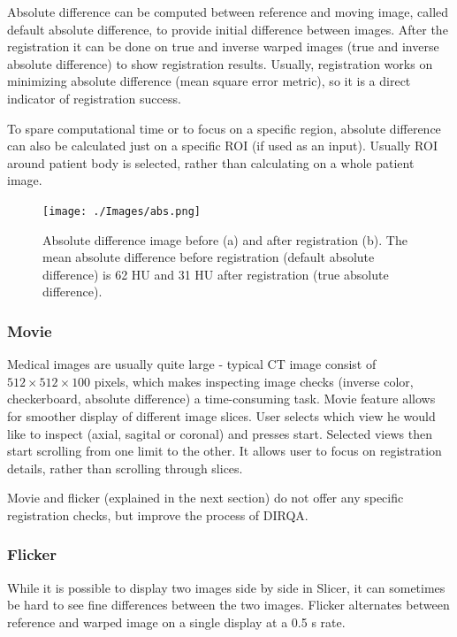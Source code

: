 \documentclass[type=dr, dr=rernat, accentcolor=tud7b,colorbacktitle, bigchapter, openright, twoside, 12pt ]{tudthesis}
\begin{document}
Absolute difference can be computed between reference and moving image, called default absolute difference, to provide initial difference between images. After the registration it can be done on
true and inverse warped images (true and inverse absolute difference) to show registration results. Usually, registration works on minimizing absolute difference (mean square error metric), so it is a direct indicator
of registration success.

To spare computational time or to focus on a specific region, absolute difference can also be calculated just on a specific ROI (if used as an input). Usually ROI around patient body is selected, rather than calculating on a whole patient image.


\begin{figure}[H]
	\begin{center}		
		\texttt{[image: ./Images/abs.png]}
		\caption{Absolute difference image before (a) and after registration (b). The mean absolute difference before registration (default absolute difference) is 62 HU and 31 HU after registration (true absolute difference).}
		\label{absDiff}
	\end{center}
\end{figure}

\subsubsection{Movie}

Medical images are usually quite large - typical CT image consist of $512 \times 512 \times 100$ pixels, which makes inspecting image checks (inverse color, checkerboard, absolute difference) a time-consuming task. Movie feature allows for smoother display of different image slices. User selects which view he would like to inspect (axial, sagital or coronal) and presses start. Selected views then start scrolling from one limit to the other. It allows user to focus on registration details, rather than scrolling through slices.

Movie and flicker (explained in the next section) do not offer any specific registration checks, but improve the process of DIRQA.

\subsubsection{Flicker}

While it is possible to display two images side by side in Slicer, it can sometimes be hard to see fine differences between the two images. Flicker alternates between reference and warped image on a single display at a 0.5 s rate.
\end{document}
